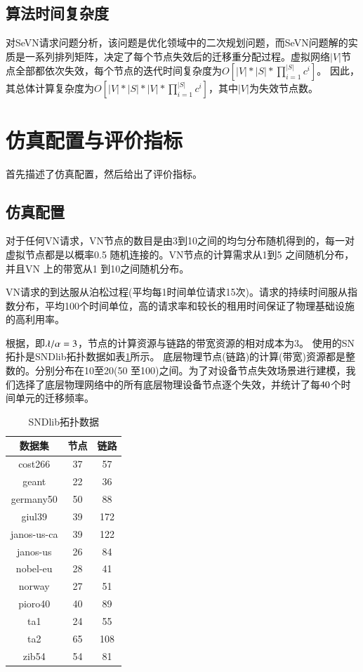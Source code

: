 \subsection{算法时间复杂度}
对SeVN请求问题分析，该问题是优化领域中的二次规划问题，而SeVN问题解的实质是一系列排列矩阵，决定了每个节点失效后的迁移重分配过程。虚拟网络$|V|$节点全部都依次失效，每个节点的迭代时间复杂度为$O[|V|*|S|*\prod_{i=1}^{|S|}c^i]$。 因此，其总体计算复杂度为$O[|V|*|S|*|V|*\prod_{i=1}^{|S|}c^i]$，其中$|V|$为失效节点数。


\section{仿真配置与评价指标}
首先描述了仿真配置，然后给出了评价指标。
\subsection{仿真配置}
对于任何VN请求，VN节点的数目是由3到10之间的均匀分布随机得到的，每一对虚拟节点都是以概率0.5 随机连接的。VN节点的计算需求从1到5 之间随机分布，并且VN 上的带宽从1 到10之间随机分布。

VN请求的到达服从泊松过程(平均每1时间单位请求15次)。请求的持续时间服从指数分布，平均100个时间单位，高的请求率和较长的租用时间保证了物理基础设施的高利用率。

根据\cite{yu2010survivable}，即$\lambda/\alpha=3$，节点的计算资源与链路的带宽资源的相对成本为3。 使用的SN 拓扑是SNDlib拓扑数据\cite{orlowski2010sndlib}如表\ref{tab:SNDlibTopo}所示。 底层物理节点(链路)的计算(带宽)资源都是整数的。分别分布在10至20(50 至100)之间。为了对设备节点失效场景进行建模，我们选择了底层物理网络中的所有底层物理设备节点逐个失效，并统计了每$40$个时间单元的迁移频率。
\begin{table}[htbp]
\centering
\caption{SNDlib拓扑数据}\label{tab:SNDlibTopo}
\begin{tabular}{|c|c|c|}
  \hline
  数据集 & 节点 & 链路 \\
  \hline
  cost266& 37& 57\\
  geant& 22& 36\\
  germany50& 50& 88\\
  giul39& 39& 172\\
  janos-us-ca& 39& 122\\
  janos-us& 26& 84\\
  nobel-eu& 28& 41\\
  norway& 27& 51\\
  pioro40& 40& 89\\
  ta1& 24& 55\\
  ta2& 65& 108\\
  zib54& 54& 81\\
  \hline

\end{tabular}
\end{table}

